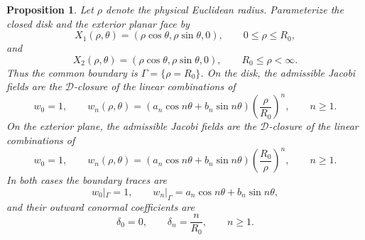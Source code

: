 \documentclass[11pt,twoside]{amsart}
\newtheorem{prop}[thm]{Proposition}
\numberwithin{equation}{section}
\begin{document}
\begin{prop} \label{prop: Ker(J) of flat-faces}
Let $\rho$ denote the physical Euclidean radius.  Parameterize the closed disk and the exterior planar face by
\[
X_1(\rho,\theta)=(\rho\cos\theta,\rho\sin\theta,0),
\qquad 0\le \rho\le R_0,
\]
and
\[
X_2(\rho,\theta)=(\rho\cos\theta,\rho\sin\theta,0),
\qquad R_0\le \rho<\infty.
\]
Thus the common boundary is $\Gamma=\{\rho=R_0\}$.  On the disk, the admissible Jacobi fields are the $\mathcal D$-closure of the linear combinations of
\[
w_0=1,\qquad
w_n(\rho,\theta)=
\left(a_n\cos n\theta+b_n\sin n\theta\right)
\left(\frac{\rho}{R_0}\right)^n,
\qquad n\ge1.
\]
On the exterior plane, the admissible Jacobi fields are the $\mathcal D$-closure of the linear combinations of
\[
w_0=1,\qquad
w_n(\rho,\theta)=
\left(a_n\cos n\theta+b_n\sin n\theta\right)
\left(\frac{R_0}{\rho}\right)^n,
\qquad n\ge1.
\]
In both cases the boundary traces are
\[
w_0|_\Gamma=1,\qquad
w_n|_\Gamma=a_n\cos n\theta+b_n\sin n\theta,
\]
and their outward conormal coefficients are
\[
\delta_0=0,\qquad \delta_n=\frac{n}{R_0},\qquad n\ge1.
\]
\end{prop}
\end{document}
